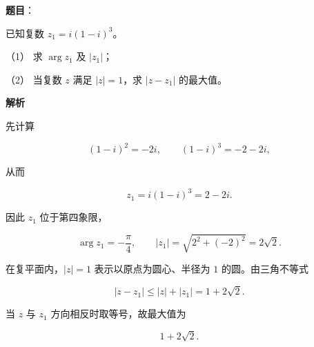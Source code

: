 \begin{answer}

\textbf{题目}：

已知复数 $z_1=i(1-i)^3$。

（1） 求 $\arg z_1$ 及 $|z_1|$；

（2） 当复数 $z$ 满足 $|z|=1$，求 $|z-z_1|$ 的最大值。

\textbf{解析}

先计算

\nopagebreak[4]
\[
(1-i)^2=-2i,\qquad (1-i)^3=-2-2i,
\]

从而

\nopagebreak[4]
\[
z_1=i(1-i)^3=2-2i.
\]


因此 $z_1$ 位于第四象限，

\nopagebreak[4]
\[
\arg z_1=-\frac\pi4,\qquad |z_1|=\sqrt{2^2+(-2)^2}=2\sqrt2.
\]


在复平面内，$|z|=1$ 表示以原点为圆心、半径为 $1$ 的圆。由三角不等式

\nopagebreak[4]
\[
|z-z_1|\le |z|+|z_1|=1+2\sqrt2.
\]

当 $z$ 与 $z_1$ 方向相反时取等号，故最大值为

\nopagebreak[4]
\[
1+2\sqrt2.
\]



\end{answer}
